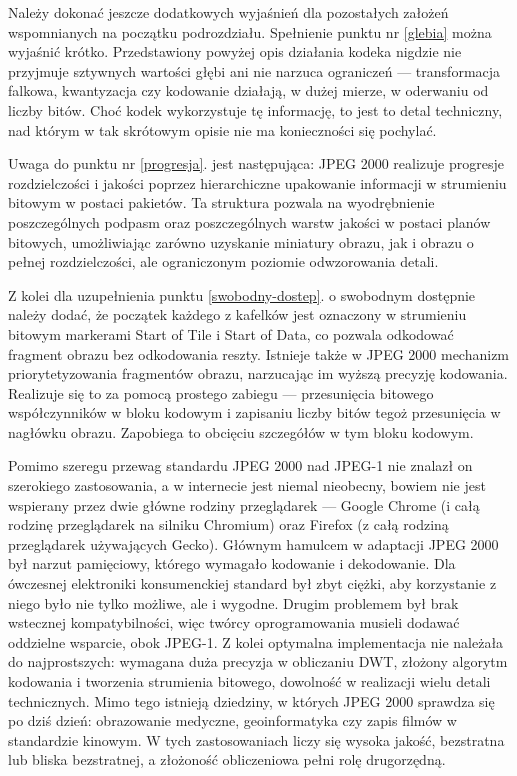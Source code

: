Należy dokonać jeszcze dodatkowych wyjaśnień dla pozostałych założeń wspomnianych na początku podrozdziału. Spełnienie punktu nr \ref{glebia} można wyjaśnić krótko. Przedstawiony powyżej opis działania kodeka nigdzie nie przyjmuje sztywnych wartości głębi ani nie narzuca ograniczeń --- transformacja falkowa, kwantyzacja czy kodowanie działają, w dużej mierze, w oderwaniu od liczby bitów. Choć kodek wykorzystuje tę informację, to jest to detal techniczny, nad którym w tak skrótowym opisie nie ma konieczności się pochylać.

Uwaga do punktu nr \ref{progresja}. jest następująca: JPEG 2000 realizuje progresje rozdzielczości i jakości poprzez hierarchiczne upakowanie informacji w strumieniu bitowym w postaci pakietów. Ta struktura pozwala na wyodrębnienie poszczególnych podpasm oraz poszczególnych warstw jakości w postaci planów bitowych, umożliwiając zarówno uzyskanie miniatury obrazu, jak i obrazu o pełnej rozdzielczości, ale ograniczonym poziomie odwzorowania detali.

Z kolei dla uzupełnienia punktu \ref{swobodny-dostep}. o swobodnym dostępnie należy dodać, że początek każdego z kafelków jest oznaczony w strumieniu bitowym markerami Start of Tile i Start of Data, co pozwala odkodować fragment obrazu bez odkodowania reszty. Istnieje także w JPEG 2000 mechanizm priorytetyzowania fragmentów obrazu, narzucając im wyższą precyzję kodowania. Realizuje się to za pomocą prostego zabiegu --- przesunięcia bitowego współczynników w bloku kodowym i zapisaniu liczby bitów tegoż przesunięcia w nagłówku obrazu. Zapobiega to obcięciu szczegółów w tym bloku kodowym.

Pomimo szeregu przewag standardu JPEG 2000 nad JPEG-1 nie znalazł on szerokiego zastosowania, a w internecie jest niemal nieobecny, bowiem nie jest wspierany przez dwie główne rodziny przeglądarek --- Google Chrome (i całą rodzinę przeglądarek na silniku Chromium) oraz Firefox (z całą rodziną przeglądarek używających Gecko). Głównym hamulcem w adaptacji JPEG 2000 był narzut pamięciowy, którego wymagało kodowanie i dekodowanie. Dla ówczesnej elektroniki konsumenckiej standard był zbyt ciężki, aby korzystanie z niego było nie tylko możliwe, ale i wygodne. Drugim problemem był brak wstecznej kompatybilności, więc twórcy oprogramowania musieli dodawać oddzielne wsparcie, obok JPEG-1. Z kolei optymalna implementacja nie należała do najprostszych: wymagana duża precyzja w obliczaniu DWT, złożony algorytm kodowania i tworzenia strumienia bitowego, dowolność w realizacji wielu detali technicznych. Mimo tego istnieją dziedziny, w których JPEG 2000 sprawdza się po dziś dzień: obrazowanie medyczne, geoinformatyka czy zapis filmów w standardzie kinowym. W tych zastosowaniach liczy się wysoka jakość, bezstratna lub bliska bezstratnej, a złożoność obliczeniowa pełni rolę drugorzędną.
